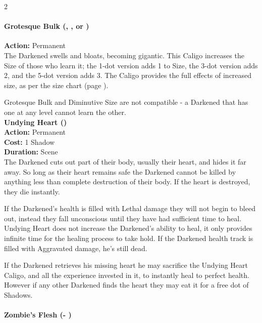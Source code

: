\begin{multicols}{2}
\paragraph*{Grotesque Bulk (\textbullet, \textbullet\textbullet\textbullet, or \textbullet\textbullet\textbullet\textbullet\textbullet)} 

\noindent \textbf{Action:} Permanent \\

\noindent The Darkened swells and bloats, becoming gigantic. This Caligo increases the Size of those who learn it; the 1-dot version adds 1 to Size, the 3-dot version adds 2, and the 5-dot version adds 3. The Caligo provides the full effects of increased size, as per the size chart (page \pageref{SizeTable}).

Grotesque Bulk and Diminutive Size are not compatible - a Darkened that has one at any level cannot learn the other. \\

\noindent \textbf{Undying Heart (\textbullet\textbullet\textbullet\textbullet\textbullet)} \\

\noindent \textbf{Action:} Permanent\\

\noindent \textbf{Cost:} 1 Shadow\\

\noindent \textbf{Duration:} Scene \\

\noindent The Darkened cuts out part of their body, usually their heart, and hides it far away. So long as their heart remains safe the Darkened cannot be killed by anything less than complete destruction of their body. If the heart is destroyed, they die instantly. 

If the Darkened's health is filled with Lethal damage they will not begin to bleed out, instead they fall unconscious until they have had sufficient time to heal. Undying Heart does not increase the Darkened's ability to heal, it only provides infinite time for the healing process to take hold. If the Darkened health track is filled with Aggravated damage, he's still dead. 

If the Darkened retrieves his missing heart he may sacrifice the Undying Heart Caligo, and all the experience invested in it, to instantly heal to perfect health. However if any other Darkened finds the heart they may eat it for a free dot of Shadows. 

\paragraph*{Zombie's Flesh (\textbullet - \textbullet\textbullet\textbullet\textbullet\textbullet)} 


\end{multicols}
